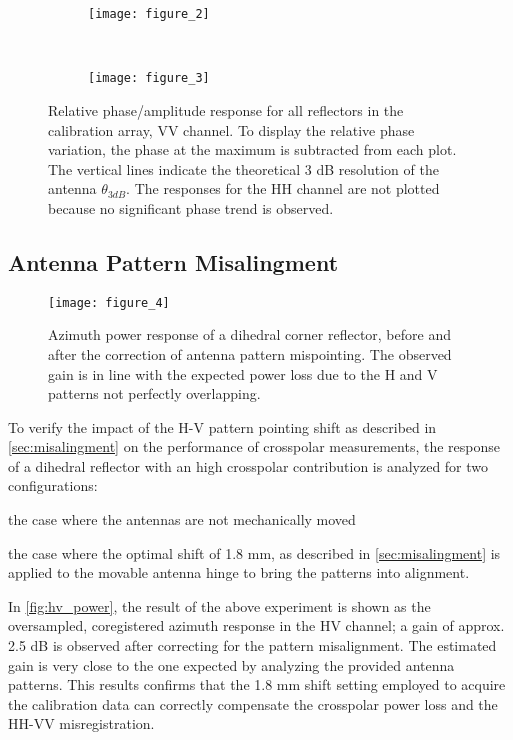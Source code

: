 \begin{figure*}[ht]
	\centering
	\begin{subfigure}[t]{\textwidth}
		\centering
		\texttt{[image: figure\_2]}
		\label{fig:phase_response_VV:uncorrected}
	\end{subfigure}\\
	\begin{subfigure}[t]{\textwidth}
		\centering
		\texttt{[image: figure\_3]}
		\label{fig:phase_response_VV:corrected}
	\end{subfigure}
	\caption{Relative phase/amplitude response for all reflectors in the calibration array, VV channel. To display the relative phase variation, the phase at the maximum is subtracted from each plot. The vertical lines indicate the theoretical 3 dB resolution of the antenna $\theta_{3dB}$. The responses for the HH channel are not plotted because no significant phase trend is observed.}
	\label{fig:phase_response_VV}
\end{figure*}

\subsection{Antenna Pattern Misalingment}
\begin{figure*}[ht!]
	\centering
	\texttt{[image: figure\_4]}
	\caption{Azimuth power response of a dihedral corner reflector, before and after the correction of antenna pattern mispointing. The observed gain is in line with the expected power loss due to the H and V patterns not perfectly overlapping.}
	\label{fig:hv_power}
\end{figure*}
To verify the impact of the H-V pattern pointing shift as described in \autoref{sec:misalingment} on the performance of crosspolar measurements, the response of a dihedral reflector with an high crosspolar contribution is analyzed for two configurations:\\ \begin{enumerate*}\item the case where the antennas are not mechanically moved \item the case where the optimal shift of 1.8 mm, as described in \autoref{sec:misalingment} is applied to the movable antenna hinge to bring the patterns into alignment.\\ 
\end{enumerate*}
In \autoref{fig:hv_power}, the result of the above experiment is shown as the oversampled, coregistered azimuth response in the HV channel; a gain of approx. 2.5 dB is observed after correcting for the pattern misalignment. The estimated gain is very close to the one expected by analyzing the provided antenna patterns. This results confirms that the 1.8 mm shift setting employed to acquire the calibration data can correctly compensate the crosspolar power loss and the HH-VV misregistration.

